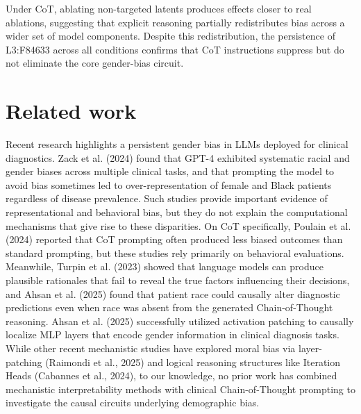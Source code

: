 \documentclass{article}
\begin{document}
Under CoT, ablating non-targeted latents produces effects closer to real ablations, suggesting that explicit reasoning partially redistributes bias across a wider set of model components. Despite this redistribution, the persistence of L3:F84633 across all conditions confirms that CoT instructions suppress but do not eliminate the core gender-bias circuit.

\section{Related work}

Recent research highlights a persistent gender bias in LLMs deployed for clinical diagnostics. Zack et al. (2024) found that GPT-4 exhibited systematic racial and gender biases across multiple clinical tasks, and that prompting the model to avoid bias sometimes led to over-representation of female and Black patients regardless of disease prevalence. Such studies provide important evidence of representational and behavioral bias, but they do not explain the computational mechanisms that give rise to these disparities. On CoT specifically, Poulain et al. (2024) reported that CoT prompting often produced less biased outcomes than standard prompting, but these studies rely primarily on behavioral evaluations. Meanwhile, Turpin et al. (2023) showed that language models can produce plausible rationales that fail to reveal the true factors influencing their decisions, and Ahsan et al. (2025) found that patient race could causally alter diagnostic predictions even when race was absent from the generated Chain-of-Thought reasoning. Ahsan et al. (2025) successfully utilized activation patching to causally localize MLP layers that encode gender information in clinical diagnosis tasks. While other recent mechanistic studies have explored moral bias via layer-patching (Raimondi et al., 2025) and logical reasoning structures like Iteration Heads (Cabannes et al., 2024), to our knowledge, no prior work has combined mechanistic interpretability methods with clinical Chain-of-Thought prompting to investigate the causal circuits underlying demographic bias. 
\end{document}
